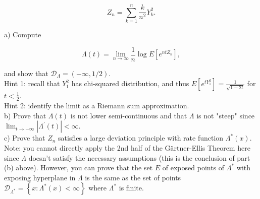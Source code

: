 \[
Z_n=\sum_{k=1}^n \frac{k}{n^2} Y_k^2 .
\]

a) Compute

\[
\Lambda(t)=\lim _{n \rightarrow \infty} \frac{1}{n} \log E\left[e^{n t Z_n}\right],
\]

and show that $\mathcal{D}_{\Lambda}=(-\infty, 1 / 2)$.\\
Hint 1: recall that $Y_1^2$ has chi-squared distribution, and thus $E\left[e^{t Y_1^2}\right]=\frac{1}{\sqrt{1-2 t}}$ for $t<\frac{1}{2}$.\\
Hint 2: identify the limit as a Riemann sum approximation.\\
b) Prove that $\Lambda(t)$ is not lower semi-continuous and that $\Lambda$ is not "steep" since $\lim _{t \rightarrow-\infty}\left|\Lambda^{\prime}(t)\right|<\infty$.\\
c) Prove that $Z_n$ satisfies a large deviation principle with rate function $\Lambda^*(x)$. Note: you cannot directly apply the 2nd half of the Gärtner-Ellis Theorem here since $\Lambda$ doesn't satisfy the necessary assumptions (this is the conclusion of part (b) above). However, you can prove that the set $E$ of exposed points of $\Lambda^*$ with exposing hyperplane in $\Lambda$ is the same as the set of points $\mathcal{D}_{\Lambda^*}=\left\{x: \Lambda^*(x)<\infty\right\}$ where $\Lambda^*$ is finite.

